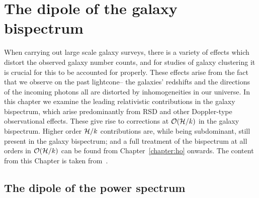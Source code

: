 
\chapter{The dipole of the galaxy bispectrum}
\label{chapter:dipole}

When carrying out large scale galaxy surveys, there is a variety of effects which distort the observed galaxy number counts, and for studies of galaxy clustering it is crucial for this to be accounted for properly. These effects arise from the fact that we observe on the past lightcone-- the galaxies' redshifts and the directions of the incoming photons all are distorted by inhomogeneities in our universe. In this chapter we examine the leading relativistic contributions in the galaxy bispectrum, which arise predominantly from RSD and other Doppler-type observational effects. These give rise to corrections at $\mathcal{O}(\mathcal{H}/k)$ in the galaxy bispectrum. Higher order $\mathcal{H}/k$ contributions are, while being subdominant, still present in the galaxy bispectrum; and a full treatment of the bispectrum at all orders in $\mathcal{O}(\mathcal{H}/k)$ can be found from Chapter~\ref{chapter:ho} onwards. The content from this Chapter is taken from~\cite{Clarkson:2018dwn}.

\section{The dipole of the power spectrum}

